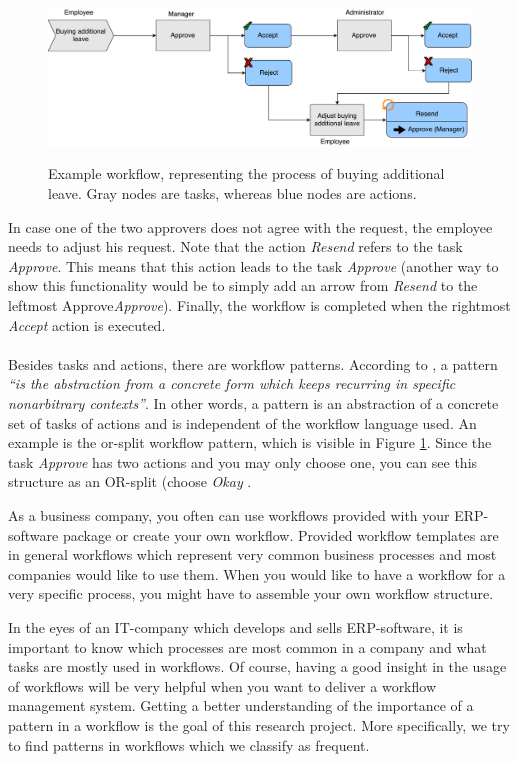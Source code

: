 \documentclass[a4paper,11pt]{article}
\begin{document}
\begin{figure}[H]
\centering
\includegraphics[width=\linewidth]{Example_Workflow.pdf}
\label{figure:example_workflow}
\caption{Example workflow, representing the process of buying additional leave. Gray nodes are tasks, whereas blue nodes are actions. }
\end{figure}

In case one of the two approvers does not agree with the request, the employee needs to adjust his request. Note that the action \textit{Resend} refers to the task \textit{Approve}. This means that this action leads to the task \textit{Approve} (another way to show this functionality would be to simply add an arrow from \textit{Resend} to the leftmost Approve\textit{Approve}). Finally, the workflow is completed when the rightmost \textit{Accept} action is executed.
\\
\\
Besides tasks and actions, there are workflow patterns. According to \cite{Riehle1996}, a pattern \textit{“is the abstraction from a concrete form which keeps recurring in specific nonarbitrary contexts”}. In other words, a pattern is an abstraction of a concrete set of tasks of actions and is independent of the workflow language used. An example is the or-split workflow pattern, which is visible in Figure \ref{figure:example_workflow}. Since the task \textit{Approve} has two actions and you may only choose one, you can see this structure as an OR-split (choose \textit{Okay} .

As a business company, you often can use workflows provided with your ERP-software package or create your own workflow. Provided workflow templates are in general workflows which represent very common business processes and most companies would like to use them. When you would like to have a workflow for a very specific process, you might have to assemble your own workflow structure.

In the eyes of an IT-company which develops and sells ERP-software, it is important to know which processes are most common in a company and what tasks are mostly used in workflows. Of course, having a good insight in the usage of workflows will be very helpful when you want to deliver a workflow management system. Getting a better understanding of the importance of a pattern in a workflow is the goal of this research project. More specifically, we try to find patterns in workflows which we classify as frequent.
\end{document}
